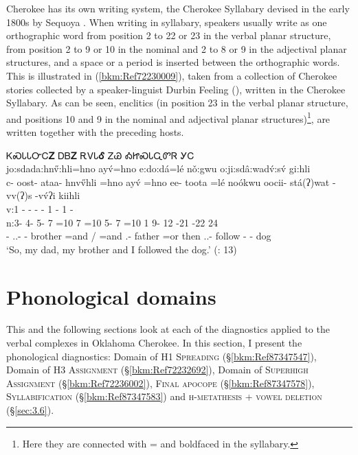 \documentclass[output=paper]{langscibook}
\begin{document}
Cherokee has its own writing system, the Cherokee Syllabary devised in the early 1800s by Sequoya \citep{Foreman1938}. When writing in syllabary, speakers usually write as one orthographic word from position 2 to 22 or 23 in the verbal planar structure, from position 2 to 9 or 10 in the nominal and 2 to 8 or 9 in the adjectival planar structures, and a space or a period is inserted between the orthographic words. This is illustrated in (\ref{bkm:Ref72230009}), taken from a collection of Cherokee stories collected by a speaker-linguist Durbin Feeling (\citealt{FeelingEtAl2018}), written in the Cherokee Syllabary. As can be seen, enclitics (in position 23 in the verbal planar structure, and positions 10 and 9 in the nominal and adjectival planar structures)\footnote{Here they are connected with = and boldfaced in the syllabary.}, are written together with the preceding hosts.

\ea\label{bkm:Ref72230009} {\cherokeefont ᏦᏍᏓᏓᏅᏟ\textbf{Ꮓ} ᎠᏴ\textbf{Ꮓ} ᎡᏙᏓ\textbf{Ꮄ} ᏃᏊ ᎣᏥᏍᏓᏩᏛᏒ ᎩᏟ} \\
    jo:sdada:hn\H{v}:hli=hno ayv́=hno e:do:dá=lé nǒ:gwu o:ji:sdâ:wadv́:sv́ gi:hli \\ 
\gllll c- oost- ataa- hnv\H{v}hli =hno ayv́ =hno ee- toota =lé noókwu oocii- stá(ʔ)wat -vv(ʔ)s -vv́ʔi kiihli \\ 
    v:1 - - - - 1 - 1 -   \\
    n:3- 4- 5- 7 =10 7 =10 5- 7 =10 1 9- 12 -21 -22 24  \\ 
     \Dist{}- \First\Du.\Excl.\Aarg{}- \Refl{}- brother =and \First\Sg{}/\Pl{} =and \First\Sg.\Barg{}- father =or then \First\Pl{}.\Excl.\Aarg{}- follow -\Prf{}{} -\Asr{} dog\\
 \glt `So, my dad, my brother and I followed the dog.' (\citealt{FeelingEtAl2018}: 13) 
 \z 

\section{Phonological domains}
\label{bkm:Ref87347154}

This and the following sections look at each of the diagnostics applied to the verbal complexes in Oklahoma Cherokee. In this section, I present the phonological diagnostics: Domain of \textsc{H1} \textsc{Spreading} (§\ref{bkm:Ref87347547}), Domain of \textsc{H3} \textsc{Assignment} (§\ref{bkm:Ref72232692}), Domain of \textsc{Superhigh} \textsc{Assignment} (§\ref{bkm:Ref72236002}), \textsc{Final} \textsc{apocope} (§\ref{bkm:Ref87347578}), \textsc{Syllabification} (§\ref{bkm:Ref87347583}) and \textsc{h{}-metathesis + vowel deletion} (§\ref{sec:3.6}).
\end{document}
